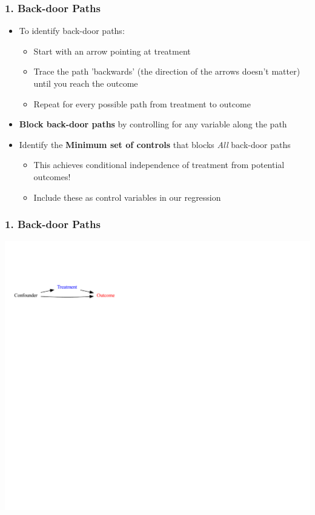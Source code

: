 \documentclass[xcolor=x11names,compress]{beamer}\usepackage[]{graphicx}\usepackage[]{color}
\newenvironment{knitrout}{}{} %
\renewcommand{\(}{\begin{columns}}
\renewcommand{\)}{\end{columns}}
\newcommand{\<}[1]{\begin{column}{#1}}
\renewcommand{\>}{\end{column}}
\begin{document}
\begin{frame}
\frametitle{1. Back-door Paths}
\begin{itemize}
\item To identify back-door paths:
\pause
\begin{itemize}
\item Start with an arrow pointing at treatment
\pause
\item Trace the path 'backwards' (the direction of the arrows doesn't matter) until you reach the outcome
\pause
\item Repeat for every possible path from treatment to outcome
\pause
\end{itemize}
\item \textbf{Block back-door paths} by controlling for any variable along the path
\pause
\item Identify the \textbf{Minimum set of controls} that blocks \textit{All} back-door paths
\pause
\begin{itemize}
\item This achieves conditional independence of treatment from potential outcomes!
\pause
\item Include these as control variables in our regression
\end{itemize}
\end{itemize}
\end{frame}

\begin{frame}
\frametitle{1. Back-door Paths}
\begin{knitrout}
\color{fgcolor}
\includegraphics[width=2.5\linewidth]{figure/Dag2b-1} 

\end{knitrout}
\end{frame}
\end{document}
